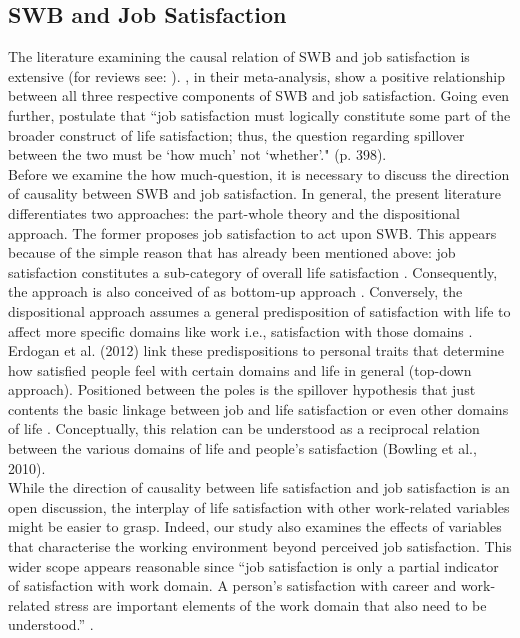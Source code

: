 \documentclass[preprint,12pt,authoryear]{elsarticle}
\begin{document}
	\subsection{SWB and Job Satisfaction}
	The literature examining the causal relation of SWB and job satisfaction is extensive
	(for reviews see: \citet{bowling_meta-analytic_2010,erdogan_whistle_2012}). \citet{bowling_meta-analytic_2010}, in their
	meta-analysis, show a positive relationship between all three respective components of SWB and job satisfaction.
	Going even further, \citet{near_job_1987} postulate that “job satisfaction must logically constitute some part of the
	broader construct of life satisfaction; thus, the question regarding spillover between the two must be ‘how much’ not
	‘whether’." (p. 398). \\
	Before we examine the how much-question, it is necessary to discuss the direction of causality between SWB and job
	satisfaction. In general, the present literature differentiates two approaches: the part-whole theory
	\citep{bowling_meta-analytic_2010,hart_predicting_1999,judge_dispositional_1998} and the dispositional approach. The former
	proposes job satisfaction to act upon SWB. This appears because of the simple reason that has already been mentioned
	above: job satisfaction constitutes a sub-category of overall life satisfaction \citep[cf.]{near_job_1987}.
	Consequently, the approach is also conceived of as bottom-up approach \citep{erdogan_whistle_2012}. Conversely, the
	dispositional approach assumes a general predisposition of satisfaction with life to affect more specific domains like work
	i.e., satisfaction with those domains \citep{bowling_meta-analytic_2010,diener_subjective_1984,headey_top-down_1991,judge_job_1993,judge_another_1993}. 
	Erdogan et al. (2012) link these predispositions to personal traits that determine how satisfied people feel with certain
	domains and life in general (top-down approach). Positioned between the poles is the spillover hypothesis that just
	contents the basic linkage between job and life satisfaction or even other domains of life 
	\citep{bowling_meta-analytic_2010,erdogan_whistle_2012,judge_job_2001,judge_individual_1994}.
	Conceptually, this relation can be understood as a reciprocal relation between the various domains of life and people’s
	satisfaction (Bowling et al., 2010). \\
	While the direction of causality between life satisfaction and job satisfaction is an open discussion, the interplay of life
	satisfaction with other work-related variables might be easier to grasp. Indeed, our study also examines the effects of
	variables that characterise the working environment beyond perceived job satisfaction. This wider scope appears
	reasonable since “job satisfaction is only a partial indicator of satisfaction with work domain. A person’s satisfaction with
	career and work-related stress are important elements of the work domain that also need to be understood.” \citep[p. 1042]{erdogan_whistle_2012}.
	
\end{document}
